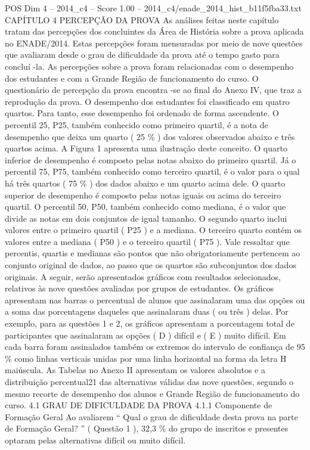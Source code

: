 \begin{textsample}{POS Dim 4 – 2014\_c4 – Score 1.00 – 2014\_c4/enade\_2014\_hist\_b11f5fba33.txt}  \label{ex:f4_pos_205}
CAPÍTULO 4 PERCEPÇÃO DA PROVA As análises feitas neste capítulo tratam das percepções dos concluintes da Área de História sobre a prova aplicada no ENADE/2014.
Estas percepções foram mensuradas por meio de nove questões que avaliaram desde o grau de dificuldade da prova até o tempo gasto para concluí -la.
As percepções sobre a prova foram relacionadas com o desempenho dos estudantes e com a Grande Região de funcionamento do curso.
O questionário de percepção da prova encontra -se ao final do Anexo IV, que traz a reprodução da prova.
O desempenho dos estudantes foi classificado em quatro quartos.
Para tanto, esse desempenho foi ordenado de forma ascendente.
O percentil 25, P25, também conhecido como primeiro quartil, é a nota de desempenho que deixa um quarto ( 25 \% ) dos valores observados abaixo e três quartos acima.
A Figura 1 apresenta uma ilustração deste conceito.
O quarto inferior de desempenho é composto pelas notas abaixo do primeiro quartil.
Já o percentil 75, P75, também conhecido como terceiro quartil, é o valor para o qual há três quartos ( 75 \% ) dos dados abaixo e um quarto acima dele.
O quarto superior de desempenho é composto pelas notas iguais ou acima do terceiro quartil.
O percentil 50, P50, também conhecido como mediana, é o valor que divide as notas em dois conjuntos de igual tamanho.
O segundo quarto inclui valores entre o primeiro quartil ( P25 ) e a mediana.
O terceiro quarto contém os valores entre a mediana ( P50 ) e o terceiro quartil ( P75 ).
Vale ressaltar que percentis, quartis e medianas são pontos que não obrigatoriamente pertencem ao conjunto original de dados, ao passo que os quartos são subconjuntos dos dados originais.
A seguir, serão apresentados gráficos com resultados selecionados, relativos às nove questões avaliadas por grupos de estudantes.
Os gráficos apresentam nas barras o percentual de alunos que assinalaram uma das opções ou a soma das porcentagens daqueles que assinalaram duas ( ou três ) delas.
Por exemplo, para as questões 1 e 2, os gráficos apresentam a porcentagem total de participantes que assinalaram as opções ( D ) difícil e ( E ) muito difícil.
Em cada barra foram assinalados também os extremos do intervalo de confiança de 95 \% como linhas verticais unidas por uma linha horizontal na forma da letra H maiúscula.
As Tabelas no Anexo II apresentam os valores absolutos e a distribuição percentual21 das alternativas válidas das nove questões, segundo o mesmo recorte de desempenho dos alunos e Grande Região de funcionamento do curso. 4.1 GRAU DE DIFICULDADE DA PROVA 4.1.1 Componente de Formação Geral Ao avaliarem “ Qual o grau de dificuldade desta prova na parte de Formação Geral? ” ( Questão 1 ), 32,3 \% do grupo de inscritos e presentes optaram pelas alternativas difícil ou muito difícil.

\end{textsample}
